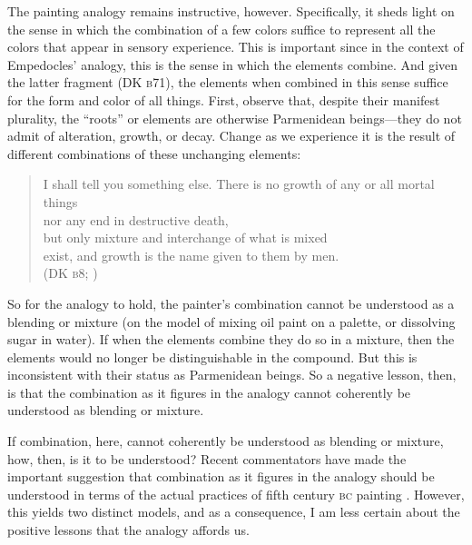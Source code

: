 The painting analogy remains instructive, however. Specifically, it sheds light on the sense in which the combination of a few colors suffice to represent all the colors that appear in sensory experience. This is important since in the context of Empedocles' analogy, this is the sense in which the elements combine. And given the latter fragment (DK \textsc{b}71), the elements when combined in this sense suffice for the form and color of all things. First, observe that, despite their manifest plurality, the ``roots'' or elements are otherwise Parmenidean beings---they do not admit of alteration, growth, or decay. Change as we experience it is the result of different combinations of these unchanging elements:
\begin{verse}
    I shall tell you something else. There is no growth of any or all mortal things\\
    nor any end in destructive death,\\
    but only mixture and interchange of what is mixed\\
    exist, and growth is the name given to them by men.\\
    (DK \textsc{b}8; \citealt[21 221]{Inwood:2001ve})
\end{verse}
So for the analogy to hold, the painter's combination cannot be understood as a blending or mixture (on the model of mixing oil paint on a palette, or dissolving sugar in water). If when the elements combine they do so in a mixture, then the elements would no longer be distinguishable in the compound. But this is inconsistent with their status as Parmenidean beings. So a negative lesson, then, is that the combination as it figures in the analogy cannot coherently be understood as blending or mixture.

If combination, here, cannot coherently be understood as blending or mixture, how, then, is it to be understood? Recent commentators have made the important suggestion that combination as it figures in the analogy should be understood in terms of the actual practices of fifth century \textsc{bc} painting \citep{Wright:1981zr,Mourelatos:1987fk,Ierodiakonou:2005fk}. However, this yields two distinct models, and as a consequence, I am less certain about the positive lessons that the analogy affords us.

